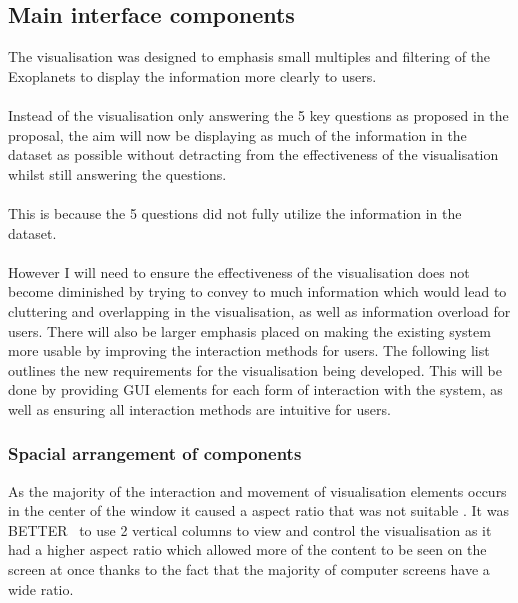 \subsection{Main interface components}
The visualisation was designed to emphasis small multiples and filtering of the Exoplanets to display the information more clearly to users. 
\\\\
Instead of the visualisation only answering the 5 key questions as proposed in the proposal, the aim will now be displaying as much of the information in the dataset as possible without detracting from the effectiveness of the visualisation whilst still answering the questions. 
\\\\
This is because the 5 questions did not fully utilize the information in the dataset. 
\\\\
However I will need to ensure the effectiveness of the visualisation does not become diminished by trying to convey to much information which would lead to cluttering and overlapping in the visualisation, as well as information overload for users. There will also be larger emphasis placed on making the existing system more usable by improving the interaction methods for users. The following list outlines the new requirements for the visualisation being developed. This will be done by providing GUI elements for each form of interaction with the system, as well as ensuring all interaction methods are intuitive for users. 
\subsubsection{Spacial arrangement of components}
As the majority of the interaction and movement of visualisation elements occurs in the center of the window it caused a aspect ratio that was not suitable . It was BETTER~ to use 2 vertical columns to view and control the visualisation as it had a higher aspect ratio which allowed more of the content to be seen on the screen at once thanks to the fact that the majority of computer screens have a wide ratio.

